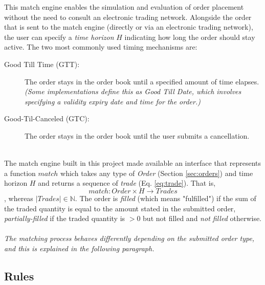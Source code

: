 This match engine enables the simulation and evaluation of order placement without the need to consult an electronic trading network.
Alongside the order that is sent to the match engine (directly or via an electronic trading network), the user can specify a \textit{time horizon} $H$ indicating how long the order should stay active.
The two most commonly used timing mechanisms are:
\begin{description}
    \item[Good Till Time (GTT): ] The order stays in the order book until a specified amount of time elapses. \textit{(Some implementations define this as Good Till Date, which involves specifying a validity expiry date and time for the order.)}
    \item[Good-Til-Canceled (GTC): ] The order stays in the order book until the user submits a cancellation.
\end{description}
\hfill
\\
The match engine built in this project made available an interface that represents a function $match$ which takes any type of \textit{Order} (Section \ref{sec:orders}) and time horizon $H$ and returns a sequence of \textit{trade} (Eq. \ref{eq:trade}).
That is,
\begin{equation}
    match : Order \times H \rightarrow Trades
\end{equation}
, whereas $|Trades| \in \mathbb{N}$.
The order is \textit{filled} (which means "fulfilled") if the sum of the traded quantity is equal to the amount stated in the submitted order, \textit{partially-filled} if the traded quantity is $> 0$ but not filled and \textit{not filled} otherwise.
\\
\\
\textit{The matching process behaves differently depending on the submitted order type, and this is explained in the following paragraph.}

\subsection{Rules}

